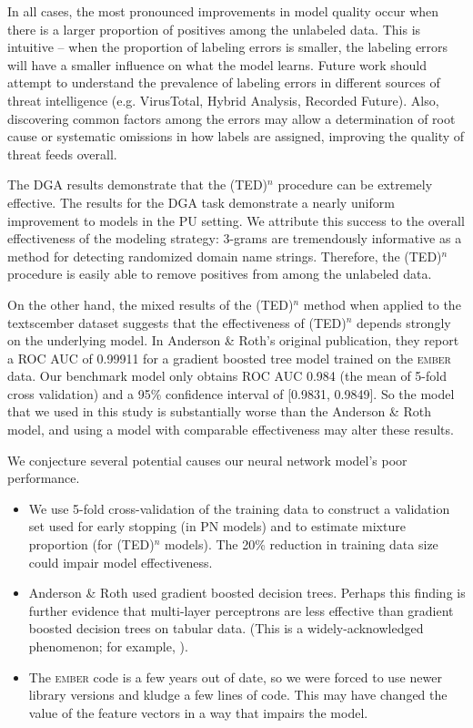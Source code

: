 \documentclass[conference]{IEEEtran}
\begin{document}
    In all cases, the most pronounced improvements in model quality occur when there is a larger proportion of positives among the unlabeled data. This is intuitive -- when the proportion of labeling errors is smaller, the labeling errors will have a smaller influence on what the model learns. Future work should attempt to understand the prevalence of labeling errors in different sources of threat intelligence (e.g. VirusTotal, Hybrid Analysis, Recorded Future). Also, discovering common factors among the errors may allow a determination of root cause or systematic omissions in how labels are assigned, improving the quality of threat feeds overall.

    The DGA results demonstrate that the (TED)${}^n$ procedure can be extremely effective. The results for the DGA task demonstrate a nearly uniform improvement to models in the PU setting. We attribute this success to the overall effectiveness of the modeling strategy: 3-grams are tremendously informative as a method for detecting randomized domain name strings. Therefore, the (TED)${}^n$ procedure is easily able to remove positives from among the unlabeled data.

    On the other hand, the mixed results of the (TED)${}^n$ method when applied to the textsc{ember} dataset suggests that the effectiveness of (TED)${}^n$ depends strongly on the underlying model. In Anderson \& Roth's original publication, they report a ROC AUC of 0.99911 for a gradient boosted tree model trained on the \textsc{ember} data. Our benchmark model only obtains ROC AUC 0.984 (the mean of 5-fold cross validation) and a 95\% confidence interval of [0.9831, 0.9849]. So the model that we used in this study is substantially worse than the Anderson \& Roth model, and using a model with comparable effectiveness may alter these results.

    We conjecture several potential causes our neural network model's poor performance.
    \begin{itemize}
        \item We use 5-fold cross-validation of the training data to construct a validation set used for early stopping (in PN models) and to estimate mixture proportion (for (TED)${}^n$ models). The 20\% reduction in training data size could impair model effectiveness.
        \item Anderson \& Roth used gradient boosted decision trees. Perhaps this finding is further evidence that multi-layer perceptrons are less effective than gradient boosted decision trees on tabular data. (This is a widely-acknowledged phenomenon; for example, \cite{armon-2022}).
        \item The \textsc{ember} code is a few years out of date, so we were forced to use newer library versions and kludge a few lines of code. This may have changed the value of the feature vectors in a way that impairs the model.
    \end{itemize}
\end{document}
